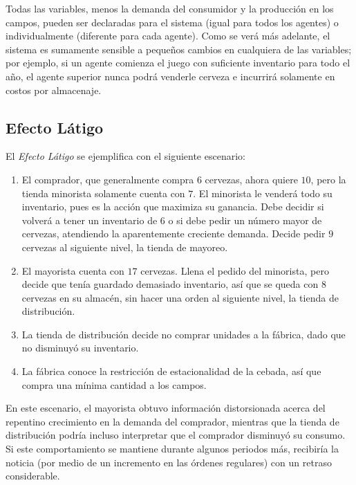 Todas las variables, menos la demanda del consumidor y la producci\'on en los campos, pueden ser declaradas para el sistema (igual para todos los agentes) o individualmente (diferente para cada agente). Como se ver\'a m\'as adelante, el sistema es sumamente sensible a peque\~nos cambios en cualquiera de las variables; por ejemplo, si un agente comienza el juego con suficiente inventario para todo el a\~no, el agente superior nunca podr\'a venderle cerveza e incurrir\'a solamente en costos por almacenaje.

\subsection{Efecto Látigo}

El \textit{Efecto Látigo} se ejemplifica con el siguiente escenario:


\begin{enumerate}
    \item El comprador, que generalmente compra $6$ cervezas, ahora quiere $10$, pero la tienda minorista solamente cuenta con $7$. El minorista le venderá todo su inventario, pues es la acci\'on que maximiza su ganancia. Debe decidir si volverá a tener un inventario de $6$ o si debe pedir un número mayor de cervezas, atendiendo la aparentemente creciente demanda. Decide pedir $9$ cervezas al siguiente nivel, la tienda de mayoreo.
    \item El mayorista cuenta con $17$ cervezas. Llena el pedido del minorista, pero decide que ten\'ia guardado demasiado inventario, as\'i que se queda con $8$ cervezas en su almac\'en, sin hacer una orden al siguiente nivel, la tienda de distribución.
    \item La tienda de distribuci\'on decide no comprar unidades a la f\'abrica, dado que no disminuy\'o su inventario.
    \item La f\'abrica conoce la restricci\'on de estacionalidad de la cebada, as\'i que compra una m\'inima cantidad a los campos.
\end{enumerate}

En este escenario, el mayorista obtuvo informaci\'on distorsionada acerca del repentino crecimiento en la demanda del comprador, mientras que la tienda de distribución podr\'ia incluso interpretar que el comprador disminuy\'o su consumo. Si este comportamiento se mantiene durante algunos periodos más, recibiría la noticia (por medio de un incremento en las órdenes regulares) con un retraso considerable.\\

